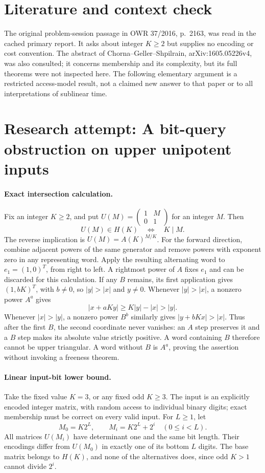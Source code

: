 \documentclass[11pt]{article}
\begin{document}
\section{Literature and context check}
The original problem-session passage in OWR 37/2016, p.~2163, was read in the cached primary report. It asks about integer $K\ge2$ but supplies no encoding or cost convention. The abstract of Chorna--Geller--Shpilrain, arXiv:1605.05226v4, was also consulted; it concerns membership and its complexity, but its full theorems were not inspected here. The following elementary argument is a restricted access-model result, not a claimed new answer to that paper or to all interpretations of sublinear time.
\section{Research attempt: A bit-query obstruction on upper unipotent inputs}

\paragraph{Exact intersection calculation.}
Fix an integer $K\ge2$, and put $U(M)=\left(\begin{smallmatrix}1&M\\0&1\end{smallmatrix}\right)$ for an integer $M$. Then
\[
 U(M)\in H(K)\quad\Longleftrightarrow\quad K\mid M.
\]
The reverse implication is $U(M)=A(K)^{M/K}$. For the forward direction, combine adjacent powers of the same generator and remove powers with exponent zero in any representing word. Apply the resulting alternating word to $e_1=(1,0)^T$, from right to left. A rightmost power of $A$ fixes $e_1$ and can be discarded for this calculation. If any $B$ remains, its first application gives $(1,bK)^T$, with $b\ne0$, so $|y|>|x|$ and $y\ne0$. Whenever $|y|>|x|$, a nonzero power $A^a$ gives
\[
 |x+aKy|\ge K|y|-|x|>|y|.
\]
Whenever $|x|>|y|$, a nonzero power $B^b$ similarly gives $|y+bKx|>|x|$. Thus after the first $B$, the second coordinate never vanishes: an $A$ step preserves it and a $B$ step makes its absolute value strictly positive. A word containing $B$ therefore cannot be upper triangular. A word without $B$ is $A^a$, proving the assertion without invoking a freeness theorem.

\paragraph{Linear input-bit lower bound.}
Take the fixed value $K=3$, or any fixed odd $K\ge3$. The input is an explicitly encoded integer matrix, with random access to individual binary digits; exact membership must be correct on every valid input. For $L\ge1$, let
\[
 M_0=K2^L,\qquad M_i=K2^L+2^i\quad(0\le i<L).
\]
All matrices $U(M_i)$ have determinant one and the same bit length. Their encodings differ from $U(M_0)$ in exactly one of its bottom $L$ digits. The base matrix belongs to $H(K)$, and none of the alternatives does, since odd $K>1$ cannot divide $2^i$.
\end{document}
